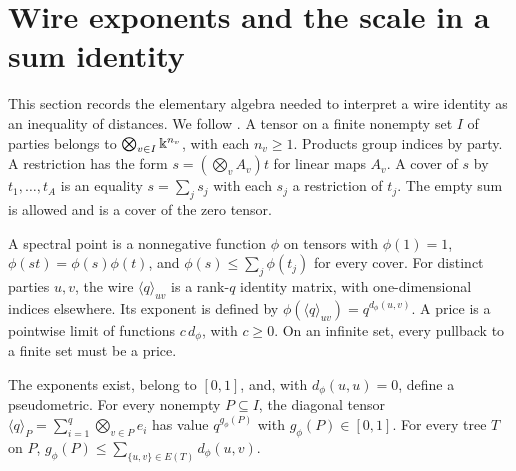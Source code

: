 \section{Wire exponents and the scale in a sum identity}
\label{sec:foundations}

This section records the elementary algebra needed to interpret a
wire identity as an inequality of distances. We follow
\cite[Definitions A.1 and A.4, pp.~19--20]{Anthropic2026}.
A tensor on a finite nonempty set $I$ of parties belongs to
$\bigotimes_{v\in I}\Bbbk^{n_v}$, with each $n_v\ge1$.
Products group indices by party. A restriction has the form
$s=(\bigotimes_v A_v)t$ for linear maps $A_v$.
A cover of $s$ by $t_1,\ldots,t_A$ is an equality
$s=\sum_j s_j$ with each $s_j$ a restriction of $t_j$.
The empty sum is allowed and is a cover of the zero tensor.

\begin{definition}\label{def:price}
A spectral point is a nonnegative function $\phi$ on tensors with
$\phi(1)=1$, $\phi(st)=\phi(s)\phi(t)$, and
$\phi(s)\le\sum_j\phi(t_j)$ for every cover.
For distinct parties $u,v$, the wire $\langle q\rangle_{uv}$
is a rank-$q$ identity matrix, with one-dimensional indices elsewhere.
Its exponent is defined by
$\phi(\langle q\rangle_{uv})=q^{d_\phi(u,v)}$.
A price is a pointwise limit of functions $c\,d_\phi$, with $c\ge0$.
On an infinite set, every pullback to a finite set must be a price.
\end{definition}

\begin{lemma}\label{lem:wire}
The exponents exist, belong to $[0,1]$, and, with
$d_\phi(u,u)=0$, define a pseudometric.
For every nonempty $P\subseteq I$, the diagonal tensor
$\langle q\rangle_P=\sum_{i=1}^q\bigotimes_{v\in P}e_i$
has value $q^{g_\phi(P)}$ with $g_\phi(P)\in[0,1]$.
For every tree $T$ on $P$,
$g_\phi(P)\le\sum_{\{u,v\}\in E(T)}d_\phi(u,v)$.
\end{lemma}

